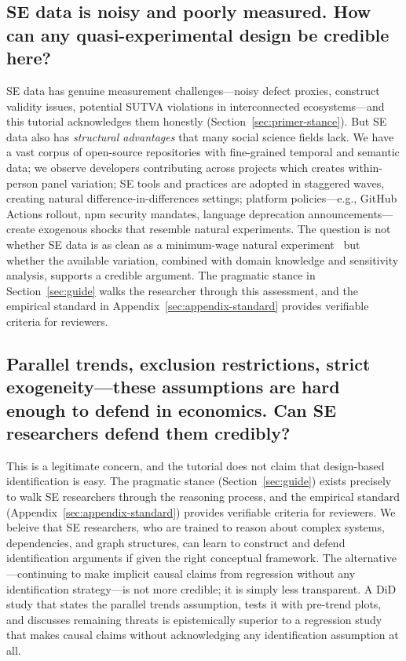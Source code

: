 
\subsection{SE data is noisy and poorly measured. How can any quasi-experimental design be credible here?}

SE data has genuine measurement challenges---noisy defect proxies, construct validity issues, potential SUTVA violations in interconnected ecosystems---and this tutorial acknowledges them honestly (Section~\ref{sec:primer-stance}).
But SE data also has \emph{structural advantages} that many social science fields lack.
We have a vast corpus of open-source repositories with fine-grained temporal and semantic data; we observe developers contributing across projects which creates within-person panel variation; SE tools and practices are adopted in staggered waves, creating natural difference-in-differences settings; platform policies---e.g., GitHub Actions rollout, npm security mandates, language deprecation announcements---create exogenous shocks that resemble natural experiments.
The question is not whether SE data is as clean as a minimum-wage natural experiment~\cite{card1994minimum} but whether the available variation, combined with domain knowledge and sensitivity analysis, supports a credible argument.
The pragmatic stance in Section~\ref{sec:guide} walks the researcher through this assessment, and the empirical standard in Appendix~\ref{sec:appendix-standard} provides verifiable criteria for reviewers.

\subsection{Parallel trends, exclusion restrictions, strict exogeneity---these assumptions are hard enough to defend in economics. Can SE researchers defend them credibly?}

This is a legitimate concern, and the tutorial does not claim that design-based identification is easy.
The pragmatic stance (Section~\ref{sec:guide}) exists precisely to walk SE researchers through the reasoning process, and the empirical standard (Appendix~\ref{sec:appendix-standard}) provides verifiable criteria for reviewers.
We beleive that SE researchers, who are trained to reason about complex systems, dependencies, and graph structures, can learn to construct and defend identification arguments if given the right conceptual framework.
The alternative---continuing to make implicit causal claims from regression without any identification strategy---is not more credible; it is simply less transparent.
A DiD study that states the parallel trends assumption, tests it with pre-trend plots, and discusses remaining threats is epistemically superior to a regression study that makes causal claims without acknowledging any identification assumption at all.

